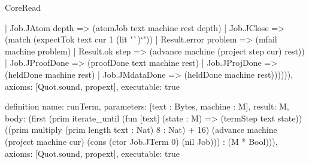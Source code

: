 \begin{lexlean}{CoreRead}
\begin{semanticmodule}
{        | Job.JAtom depth => (atomJob text machine rest depth)
        | Job.JClose => (match (expectTok text cur 1 (lit "`)`"))
          | Result.error problem => (mfail machine problem)
          | Result.ok step => (advance machine (project step cur) rest))
        | Job.JProofDone => (proofDone text machine rest)
        | Job.JProjDone => (heldDone machine rest)
        | Job.JMdataDone => (heldDone machine rest)))))),
  axioms: [Quot.sound, propext],
  executable: true
}

definition{
  name: runTerm,
  parameters: [text : Bytes, machine : M],
  result: M,
  body: (first (prim iterate_until (fun [text] (state : M) => (termStep text state)) ((prim multiply (prim length text : Nat) 8 : Nat) + 16) (advance machine (project machine cur) (cons (ctor Job.JTerm 0) (nil Job))) : (M * Bool))),
  axioms: [Quot.sound, propext],
  executable: true
}


\end{semanticmodule}
\end{lexlean}
